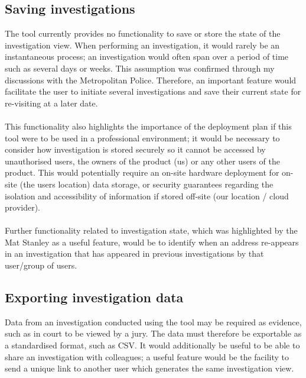 \subsection{Saving investigations}
The tool currently provides no functionality to save or store the state of the investigation view. When performing an investigation, it would rarely be an instantaneous process; an investigation would often span over a period of time such as several days or weeks. This assumption was confirmed through my discussions with the Metropolitan Police. Therefore, an important feature would facilitate the user to initiate several investigations and save their current state for re-visiting at a later date. 
\\\\
This functionality also highlights the importance of the deployment plan if this tool were to be used in a professional environment; it would be necessary to consider how investigation is stored securely so it cannot be accessed by unauthorised users, the owners of the product (us) or any other users of the product. This would potentially require an on-site hardware deployment for on-site (the users location) data storage, or security guarantees regarding the isolation and accessibility of information if stored off-site (our location / cloud provider). 
\\\\
Further functionality related to investigation state, which was highlighted by the Mat Stanley as a useful feature, would be to identify when an address re-appears in an investigation that has appeared in previous investigations by that user/group of users. 

\subsection{Exporting investigation data}
Data from an investigation conducted using the tool may be required as evidence, such as in court to be viewed by a jury. The data must therefore be exportable as a standardised format, such as CSV. It would additionally be useful to be able to share an investigation with colleagues; a useful feature would be the facility to send a unique link to another user which generates the same investigation view. 

